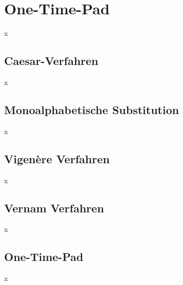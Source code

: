 \chapter{One-Time-Pad}
x

\section{Caesar-Verfahren}
x

\section{Monoalphabetische Substitution}
x

\section{Vigenère Verfahren}
x

\section{Vernam Verfahren}
x

\section{One-Time-Pad}
x
